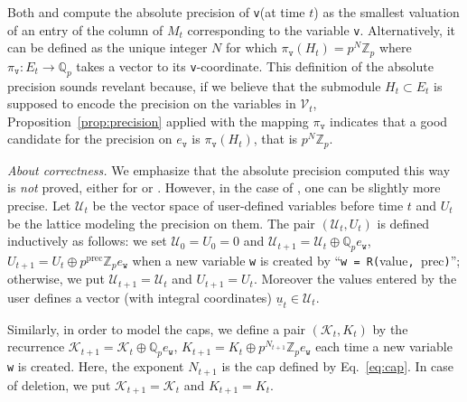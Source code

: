 \documentclass[sigconf]{acmart}
\newcommand{\Z}{\mathbb Z}
\newcommand{\Zp}{\Z_p}
\newcommand{\Q}{\mathbb Q}
\newcommand{\Qp}{\Q_p}
\newcommand{\calV}{\mathcal{V}}
\newcommand{\ttv}{\texttt{v}\xspace}
\newcommand{\ttw}{\texttt{w}\xspace}
\newcommand{\calU}{\mathcal{U}}
\newcommand{\calK}{\mathcal{K}}
\newcommand{\ZpLC}{\text{\color{output} \rm \tt ZpLC}\xspace}
\newcommand{\ZpLF}{\text{\color{output} \rm \tt ZpLF}\xspace}
\theoremstyle{definition}
\begin{document}
\smallskip

\noindent
Both \ZpLC and \ZpLF compute the absolute precision of \ttv (at time 
$t$) as the smallest valuation of an entry of the column of $M_t$ 
corresponding to the variable \ttv. Alternatively, it can be defined as 
the unique integer $N$ for which $\pi_\ttv(H_t) = p^N \Zp$ where 
$\pi_\ttv : E_t \to \Qp$ takes a vector to its \ttv-coordinate.
This definition of the absolute precision sounds revelant because, if we 
believe that the submodule $H_t \subset E_t$ is supposed to encode the 
precision on the variables in $\calV_t$, 
Proposition~\ref{prop:precision} applied with the mapping $\pi_\ttv$ 
indicates that a good candidate for the precision on $e_\ttv$ is 
$\pi_\ttv(H_t)$, that is $p^N \Zp$.

\medskip

\noindent \textit{About correctness.}
%
We emphasize that the absolute precision computed this way is \emph{not} 
proved, either for \ZpLF or \ZpLC. However, in the case of \ZpLC, one
can be slightly more precise. Let $\calU_t$ be the vector space of 
user-defined variables before time $t$ and $U_t$ be the lattice
modeling the precision on them. The pair $(\calU_t, U_t)$ is defined 
inductively as follows: we set $\calU_0 = U_0 = 0$ and 
$\calU_{t+1} = \calU_t \oplus \Qp e_\ttw$,
$U_{t+1} = U_t \oplus p^{\text{prec}} \Zp e_\ttw$
when a new variable \ttw is created by
``\verb?w = R(?value\verb?, ?prec\verb?)?''; otherwise, we put 
$\calU_{t+1} = \calU_t$ and $U_{t+1} = U_t$. Moreover the values
entered by the user defines a vector (with integral coordinates)
$\underline u_t \in \calU_t$.

Similarly, in order to model the caps, we define a pair $(\calK_t, 
K_t)$ by the recurrence $\calK_{t+1} = \calK_t \oplus \Qp e_\ttw$,
$K_{t+1} = K_t \oplus p^{N_{t+1}} \Zp e_\ttw$
each time a new variable \ttw is created. 
Here, the exponent $N_{t+1}$ is the cap defined by Eq.~\eqref{eq:cap}.
In case of deletion, we put $\calK_{t+1} = \calK_t$ and $K_{t+1} = K_t$.
\end{document}
